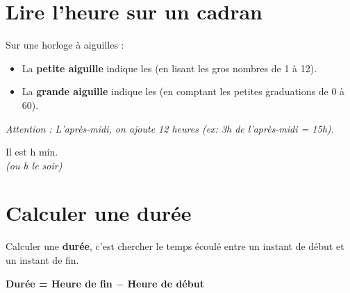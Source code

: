 \documentclass[a4paper]{book}
\begin{document}
    
\section{Lire l'heure sur un cadran}
    
    \begin{minipage}{0.6\textwidth}
        Sur une horloge à aiguilles :
        \begin{itemize}
            \item La \textbf{petite aiguille} indique les \points[10] (en lisant les gros nombres de 1 à 12).
            \item La \textbf{grande aiguille} indique les \points[10] (en comptant les petites graduations de 0 à 60).
        \end{itemize}
        \textit{Attention : L'après-midi, on ajoute 12 heures (ex: 3h de l'après-midi = 15h).}
    \end{minipage}
    \hfill
    \begin{minipage}{0.35\textwidth}
        \begin{center}
        
        Il est \points[3] h \points[3] min.\\
        \textit{(ou \points[3] h \points[3] le soir)}
        \end{center}
    \end{minipage}

    
\newpage 
    
\section{Calculer une durée}
    
    Calculer une \textbf{durée}, c'est chercher le temps écoulé entre un instant de début et un instant de fin. 
    \\[0.2cm]
    \centerline{\textbf{Durée = Heure de fin $-$ Heure de début}}
    
\end{document}
